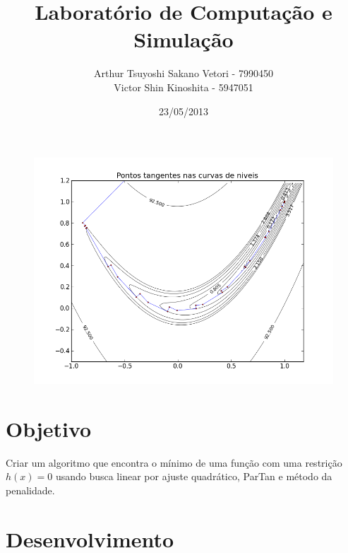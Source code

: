 \documentclass[12pt]{article}
\begin{document}
\title{Laboratório de Computação e Simulação}
\author{Arthur Tsuyoshi Sakano Vetori - 7990450 \\ Victor Shin Kinoshita - 5947051}
\date{23/05/2013}
\maketitle

\begin{figure}[!h]
\begin{center}
\includegraphics[width=14cm]{0_5_1_2_tangente.png}
\end{center}
\end{figure}

\newpage


\section{Objetivo}
\mbox{}

Criar um algoritmo que encontra o mínimo de uma função com uma restrição $h(x) = 0$ usando busca linear por ajuste quadrático, ParTan e método da penalidade.



\section{Desenvolvimento}
\mbox{}
\end{document}

